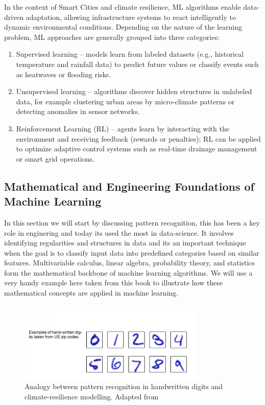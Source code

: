 \documentclass[12pt]{article}
\begin{document}
In the context of Smart Cities and climate resilience, ML algorithms enable data-driven adaptation, allowing infrastructure 
systems to react intelligently to dynamic environmental conditions. Depending on the nature of the learning problem, 
ML approaches are generally grouped into three categories:
\begin{enumerate}
    \item Supervised learning -- models learn from labeled datasets (e.g., historical temperature and rainfall data) to 
    predict future values or classify events such as heatwaves or flooding risks.
    \item Unsupervised learning -- algorithms discover hidden structures in unlabeled data, for example clustering 
    urban areas by micro-climate patterns or detecting anomalies in sensor networks.
    \item Reinforcement Learning (RL) -- agents learn by interacting with the environment and receiving 
    feedback (rewards or penalties); RL can be applied to optimize adaptive control systems such as real-time 
    drainage management or smart grid operations.
\end{enumerate}
\subsection{Mathematical and Engineering Foundations of Machine Learning}
In this section we will start by discussing pattern recognition, this has been a key role in enginering and today its used the most in data-science. 
It involves identifying regularities and structures in data and its an important technique when the goal is to classify input data into predefined categories based on similar features.
Multivariable calculus, linear algebra, probability theory, and statistics form the mathematical backbone of machine learning algorithms.\cite{bishop2006pattern}
We will use a very handy example here taken from this book \cite{bishop2006pattern} to illustrate how these mathematical concepts are applied in machine learning.

\begin{figure}[h]
    \centering
    \includegraphics[width=0.8\textwidth]{images/Machine_learning_pixel.png}
    \caption{Analogy between pattern recognition in handwritten digits and climate-resilience modelling. Adapted from \cite{bishop2006pattern}}
    \label{fig:ml_example}
\end{figure}
\end{document}
